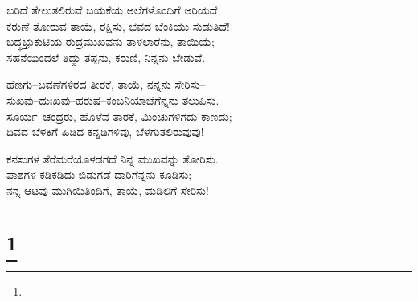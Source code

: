 \begin{myquote}
ಬರಿದೆ ತೇಲುತಲಿರುವೆ ಬಯಕೆಯ ಅಲೆಗಳೊಂದಿಗೆ ಅರಿಯದೆ;\\ಕರುಣೆ ತೋರುವ ತಾಯೆ, ರಕ್ಷಿಸು, ಭವದ ಬೆಂಕಿಯು ಸುಡುತಿದೆ!\\ಬದ್ಧಭ್ರುಕುಟಿಯ ರುದ್ರಮುಖವನು ತಾಳಲಾರೆನು, ತಾಯಿಯೆ;\\ಸಹನೆಯಿಂದಲೆ ತಿದ್ದು ತಪ್ಪನು, ಕರುಣಿ, ನಿನ್ನನು ಬೇಡುವೆ.
\end{myquote}

\begin{myquote}
ಹೆಣಗು–ಬವಣೆಗಳಿರದ ತೀರಕೆ, ತಾಯೆ, ನನ್ನನು ಸೇರಿಸು–\\ಸುಖವು–ದುಃಖವು–ಹರುಷ–ಕಂಬನಿಯಾಚೆಗೆನ್ನನು ತಲುಪಿಸು.\\ಸೂರ್ಯ–ಚಂದ್ರರು, ಹೊಳೆವ ತಾರಕೆ, ಮಿಂಚುಗಳಿಗದು ಕಾಣದು;\\ದಿವದ ಬೆಳಕಿಗೆ ಹಿಡಿದ ಕನ್ನಡಿಗಳಿವು, ಬೆಳಗುತಲಿರುವುವು!
\end{myquote}

\begin{myquote}
ಕನಸುಗಳ ತೆರೆಮರೆಯೊಳಡಗದೆ ನಿನ್ನ ಮುಖವನ್ನು ತೋರಿಸು.\\ಪಾಶಗಳ ಕಡಿಕಡಿದು ಬಿಡುಗಡೆ ದಾರಿಗೆನ್ನನು ಕೂಡಿಸು;\\ನನ್ನ ಆಟವು ಮುಗಿಯಿತಿಂದಿಗೆ, ತಾಯೆ, ಮಡಿಲಿಗೆ ಸೇರಿಸು!
\end{myquote}

\selecteng

\chapter[PEACE]{\protect\footnote{}}

\begin{myquote}
\end{myquote}

\begin{myquote}
\end{myquote}

\begin{myquote}
\end{myquote}

